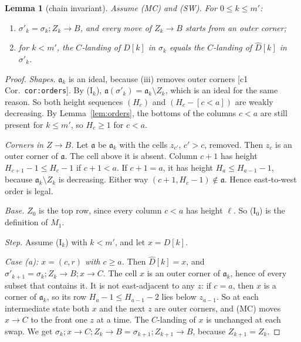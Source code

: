 \documentclass[11pt]{article}
\newtheorem{lemma}[theorem]{Lemma}
\theoremstyle{definition}
\newcommand{\toB}{\!\to\! B}
\newcommand{\toC}{\!\to\! C}
\newcommand{\fa}{\mathfrak a}
\begin{document}
\begin{lemma}[chain invariant]\label{lem:chain}
Assume (MC) and (SW). For $0\le k\le m'$:
\begin{enumerate}
\item[(I$_k$)] $\sigma'_k=\sigma_k;Z_k\toB$, and every move of $Z_k\toB$ starts from an outer corner;
\item[(L$_k$)] for $k<m'$, the $C$-landing of $D[k]$ in $\sigma_k$ equals the $C$-landing of $\hat D[k]$ in $\sigma'_k$.
\end{enumerate}
\end{lemma}
\begin{proof}
\emph{Shapes.} $\fa_k$ is an ideal, because (iii) removes outer corners [c1 Cor.~\texttt{cor:orders}]. By (I$_k$),
$\fa(\sigma'_k)=\fa_k\setminus Z_k$, which is an ideal for the same reason. So both height sequences $(H_c)$ and
$(H_c-[c<a])$ are weakly decreasing. By Lemma~\ref{lem:orders}, the bottoms of the columns $c<a$ are still present for $k\le m'$,
so $H_c\ge1$ for $c<a$.

\emph{Corners in $Z\toB$.} Let $\fa$ be $\fa_k$ with the cells $z_{c'}$, $c'>c$, removed. Then $z_c$ is an outer corner of $\fa$.
The cell above it is absent. Column $c+1$ has height $H_{c+1}-1\le H_c-1$ if $c+1<a$. If $c+1=a$, it has height
$H_a\le H_{a-1}-1$, because $\fa_k\setminus Z_k$ is decreasing. Either way $(c+1,H_c-1)\notin\fa$. Hence east-to-west order
is legal.

\emph{Base.} $Z_0$ is the top row, since every column $c<a$ has height $\ell$. So (I$_0$) is the definition of $M_1$.

\emph{Step.} Assume (I$_k$) with $k<m'$, and let $x=D[k]$.

\noindent\emph{Case (a): $x=(c,r)$ with $c\ge a$.} Then $\hat D[k]=x$, and
$\sigma'_{k+1}=\sigma_k;Z_k\toB;x\toC$. The cell $x$ is an outer corner of $\fa_k$, hence of every subset that contains it. It is not east-adjacent to
any $z$: if $c=a$, then $x$ is a corner of $\fa_k$, so its row $H_a-1\le H_{a-1}-2$ lies below $z_{a-1}$. So at each
intermediate state both $x$ and the next $z$ are outer corners, and (MC) moves $x\toC$ to the front one $z$ at a time. The
$C$-landing of $x$ is unchanged at each swap. We get $\sigma_k;x\toC;Z_k\toB=\sigma_{k+1};Z_{k+1}\toB$, because $Z_{k+1}=Z_k$.


\end{proof}
\end{document}
